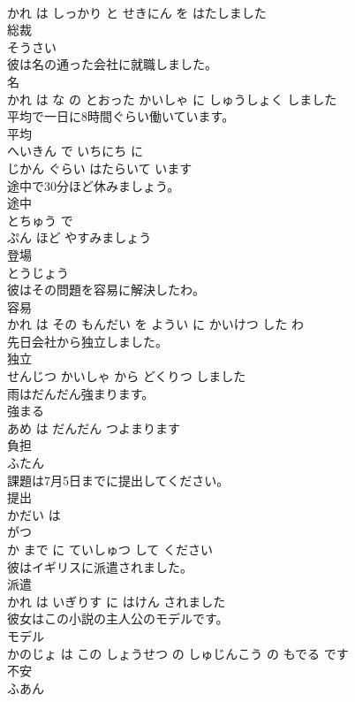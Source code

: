 \documentclass[8pt]{extreport}
\begin{document}
\begin{CJK}{UTF8}{min}
\\	かれ は しっかり と せきにん を はたしました			
\\	総裁	
\\	そうさい		
\\	彼は名の通った会社に就職しました。	
\\	名 
\\	かれ は な の とおった かいしゃ に しゅうしょく しました			
\\	平均で一日に8時間ぐらい働いています。	
\\	平均 
\\	へいきん で いちにち に 
\\	じかん ぐらい はたらいて います			
\\	途中で30分ほど休みましょう。	
\\	途中 
\\	とちゅう で 
\\	ぷん ほど やすみましょう			
\\	登場	
\\	とうじょう		
\\	彼はその問題を容易に解決したわ。	
\\	容易 
\\	かれ は その もんだい を ようい に かいけつ した わ			
\\	先日会社から独立しました。	
\\	独立 
\\	せんじつ かいしゃ から どくりつ しました			
\\	雨はだんだん強まります。	
\\	強まる 
\\	あめ は だんだん つよまります			
\\	負担	
\\	ふたん		
\\	課題は7月5日までに提出してください。	
\\	提出 
\\	かだい は 
\\	がつ 
\\	か まで に ていしゅつ して ください			
\\	彼はイギリスに派遣されました。	
\\	派遣 
\\	かれ は いぎりす に はけん されました			
\\	彼女はこの小説の主人公のモデルです。	
\\	モデル 
\\	かのじょ は この しょうせつ の しゅじんこう の もでる です			
\\	不安	
\\	ふあん		

\end{CJK}
\end{document}
